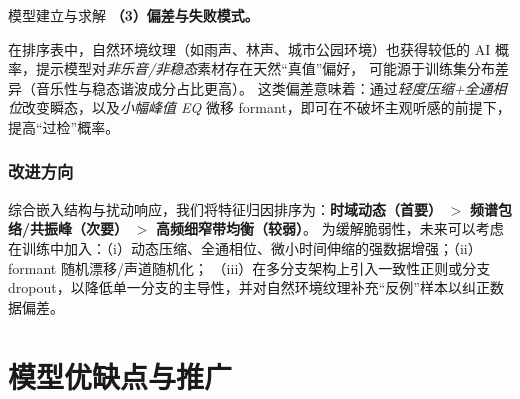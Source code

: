 \documentclass[aspectratio=169]{beamer}
\providecommand{\paragraph}[1]{\smallskip\textbf{#1}\par}
\begin{document}
\begin{frame}{模型建立与求解}
\paragraph{（3）偏差与失败模式。}
在排序表中，自然环境纹理（如雨声、林声、城市公园环境）也获得较低的 AI 概率，提示模型对\emph{非乐音/非稳态}素材存在天然“真值”偏好，
可能源于训练集分布差异（音乐性与稳态谐波成分占比更高）。
这类偏差意味着：通过\emph{轻度压缩+全通相位}改变瞬态，以及\emph{小幅峰值 EQ} 微移 formant，即可在不破坏主观听感的前提下，提高“过检”概率。

\subsubsection{改进方向}
综合嵌入结构与扰动响应，我们将特征归因排序为：\textbf{时域动态（首要）} $>$ \textbf{频谱包络/共振峰（次要）} $>$ \textbf{高频细窄带均衡（较弱）}。
为缓解脆弱性，未来可以考虑在训练中加入：（i）动态压缩、全通相位、微小时间伸缩的强数据增强；（ii）formant 随机漂移/声道随机化；
（iii）在多分支架构上引入一致性正则或分支 dropout，以降低单一分支的主导性，并对自然环境纹理补充“反例”样本以纠正数据偏差。
\end{frame}

\section{模型优缺点与推广}
\end{document}
